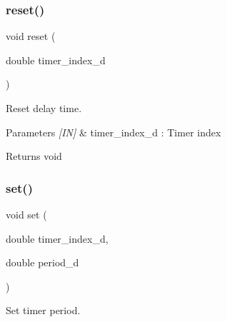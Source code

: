 \subsubsection{reset()}
{\footnotesize\ttfamily void reset (\begin{DoxyParamCaption}\item[{double}]{timer\+\_\+index\+\_\+d }\end{DoxyParamCaption})}



Reset delay time. 


\begin{DoxyCode}{0}
\DoxyCodeLine{\{}
\DoxyCodeLine{\}}
\end{DoxyCode}



\begin{DoxyParams}{Parameters}
{\em \mbox{[}\+I\+N\mbox{]}} & timer\+\_\+index\+\_\+d \+: Timer index \\
\hline
\end{DoxyParams}
\begin{DoxyReturn}{Returns}
void 
\end{DoxyReturn}
\mbox{\label{classtimer_ad1cb33ee25cf634170a842d412846c12}} 
\subsubsection{set()}
{\footnotesize\ttfamily void set (\begin{DoxyParamCaption}\item[{double}]{timer\+\_\+index\+\_\+d,  }\item[{double}]{period\+\_\+d }\end{DoxyParamCaption})}



Set timer period. 


\begin{DoxyCode}{0}
\DoxyCodeLine{\{}
\DoxyCodeLine{\}}
\end{DoxyCode}



